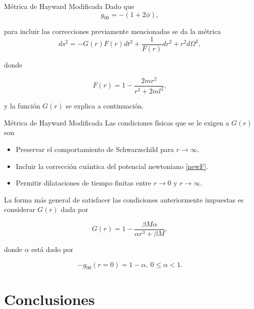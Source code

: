 \documentclass[t]{beamer}
\numberwithin{equation}{section}
\begin{document}
\begin{frame}{Métrica de Hayward Modificada}
Dado que 
\begin{equation}
\label{newton - metric}
g_{00} = - (1 + 2\phi),
\end{equation}

para incluir las correcciones previamente mencionadas se da la métrica
\begin{equation}
\label{reg-schF}
ds^2 = -G(r)F(r) dt^2 + \frac{1}{F(r)} dr^2 + r^2d\Omega^2,
\end{equation}

donde

\begin{equation}
\label{mod-hay-f}
F(r) = 1 - \frac{2mr^2}{r^3 + 2ml^2},
\end{equation}

y la función $G(r)$ se explica a continuación.

\end{frame}

\begin{frame}{Métrica de Hayward Modificada}
Las condiciones físicas que se le exigen a $G(r)$ son
\begin{itemize}
\item Preservar el comportamiento de Schwarzschild para $r \to \infty$.
\item Incluir la corrección cuántica del potencial newtoniano \eqref{newF}.
\item Permitir dilataciones de tiempo finitas entre $r \to 0$ y $r \to \infty$.
\end{itemize}

La forma más general de satisfacer las condiciones anteriormente impuestas es considerar $G(r)$ dada por

\begin{equation}
\label{mod-hay-g}
G(r) = 1 - \frac{\beta M \alpha}{\alpha r^3 + \beta M},
\end{equation}

donde $\alpha$ está dado por

\begin{equation}
-g_{00}(r = 0) = 1 - \alpha,\ 0 \leq \alpha < 1.
\end{equation}
\end{frame}


\section{\label{conclusions} Conclusiones}
\end{document}
